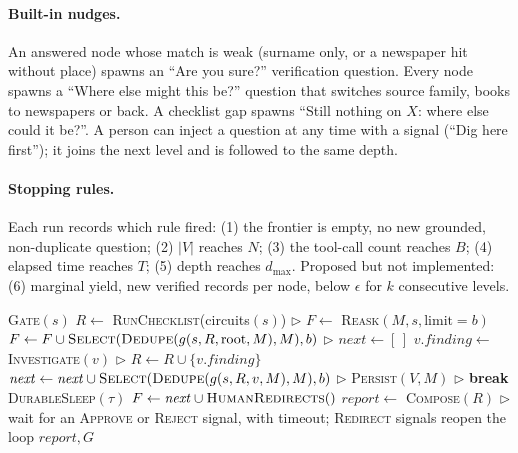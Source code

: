 \paragraph{Built-in nudges.} An answered node whose match is weak (surname only, or a newspaper hit without place) spawns an ``Are you sure?'' verification question. Every node spawns a ``Where else might this be?'' question that switches source family, books to newspapers or back. A checklist gap spawns ``Still nothing on $X$: where else could it be?''. A person can inject a question at any time with a signal (``Dig here first''); it joins the next level and is followed to the same depth.

\paragraph{Stopping rules.} Each run records which rule fired: (1) the frontier is empty, no new grounded, non-duplicate question; (2) $|V|$ reaches $N$; (3) the tool-call count reaches $B$; (4) elapsed time reaches $T$; (5) depth reaches $d_{\max}$. Proposed but not implemented: (6) marginal yield, new verified records per node, below $\epsilon$ for $k$ consecutive levels.

\begin{algorithm*}[t]
\caption{\CR as a durable workflow. Lines marked $\triangleright$ are activities: recorded in event history, retried, never repeated after they finish.}
\label{alg:cr}
\footnotesize
\begin{algorithmic}[1]
\State \textsc{Gate}$(s)$ 
\State $R \gets$ \textsc{RunChecklist}(circuits$(s)$) $\triangleright$ 
\State $F \gets$ \textsc{Reask}$(M, s, \text{limit}=b)$ 
\State $F \gets F \cup \textsc{Select}(\textsc{Dedupe}(g(s,R,\text{root},M),M),b)$ $\triangleright$
  \State $\mathit{next} \gets [\,]$
    \State $v.\mathit{finding} \gets$ \textsc{Investigate}$(v)$ $\triangleright$ 
    \State $R \gets R \cup \{v.\mathit{finding}\}$
     $\mathit{next} \gets \mathit{next} \cup \textsc{Select}(\textsc{Dedupe}(g(s,R,v,M),M),b)$ $\triangleright$ \EndIf
  \EndFor
  \State \textsc{Persist}$(V, M)$ $\triangleright$ 
   \textbf{break} \EndIf
  \State \textsc{DurableSleep}$(\tau)$ 
  \State $F \gets \mathit{next} \cup \textsc{HumanRedirects}()$
\EndWhile
\State $\mathit{report} \gets$ \textsc{Compose}$(R)$ $\triangleright$ 
\State wait for an \textsc{Approve} or \textsc{Reject} signal, with timeout; \textsc{Redirect} signals reopen the loop
\State \Return $\mathit{report}, G$
\EndProcedure
\end{algorithmic}
\end{algorithm*}

